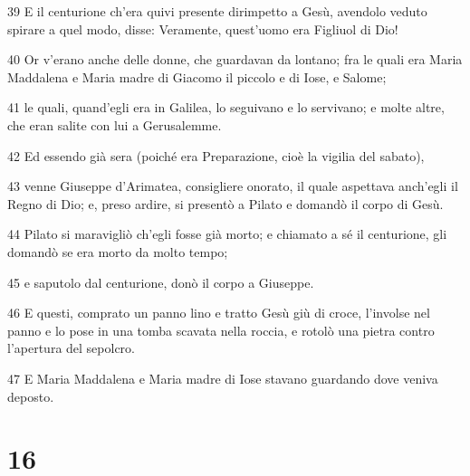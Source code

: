 \par 39 E il centurione ch'era quivi presente dirimpetto a Gesù, avendolo veduto spirare a quel modo, disse: Veramente, quest'uomo era Figliuol di Dio!
\par 40 Or v'erano anche delle donne, che guardavan da lontano; fra le quali era Maria Maddalena e Maria madre di Giacomo il piccolo e di Iose, e Salome;
\par 41 le quali, quand'egli era in Galilea, lo seguivano e lo servivano; e molte altre, che eran salite con lui a Gerusalemme.
\par 42 Ed essendo già sera (poiché era Preparazione, cioè la vigilia del sabato),
\par 43 venne Giuseppe d'Arimatea, consigliere onorato, il quale aspettava anch'egli il Regno di Dio; e, preso ardire, si presentò a Pilato e domandò il corpo di Gesù.
\par 44 Pilato si maravigliò ch'egli fosse già morto; e chiamato a sé il centurione, gli domandò se era morto da molto tempo;
\par 45 e saputolo dal centurione, donò il corpo a Giuseppe.
\par 46 E questi, comprato un panno lino e tratto Gesù giù di croce, l'involse nel panno e lo pose in una tomba scavata nella roccia, e rotolò una pietra contro l'apertura del sepolcro.
\par 47 E Maria Maddalena e Maria madre di Iose stavano guardando dove veniva deposto.

\chapter{16}

